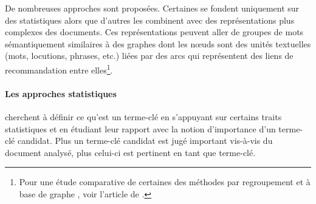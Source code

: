         De nombreuses approches sont proposées. Certaines se fondent uniquement
        sur des statistiques alors que d'autres les combinent avec des
        représentations plus complexes des documents. Ces représentations
        peuvent aller de groupes de mots sémantiquement similaires à des graphes
        dont les n\oe{}uds sont des unités textuelles (mots, locutions, phrases,
        etc.) liées par des arcs qui représentent des liens de recommandation
        entre elles\footnote{Pour une étude comparative de certaines des
        méthodes par regroupement \cite{liu2009keycluster} et à base de graphe
        \cite{mihalcea2004textrank, wan2008expandrank}, voir l'article de
        .}.

        \paragraph{Les approches statistiques}
          cherchent à définir ce qu'est un terme-clé en s'appuyant sur certains
          traits statistiques et en étudiant leur rapport avec la notion
          d'importance d'un terme-clé candidat. Plus un terme-clé candidat est
          jugé important vis-à-vis du document analysé, plus celui-ci est
          pertinent en tant que terme-clé.

